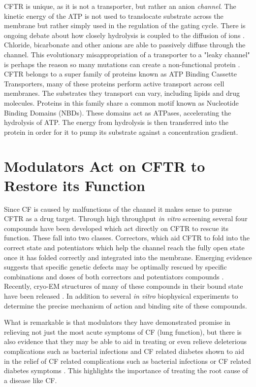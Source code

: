 CFTR is unique, as it is not a transporter, but rather an anion \textit{channel}. The kinetic energy of the ATP is not used to translocate substrate across the membrane but rather simply used in the regulation of the gating cycle. There is ongoing debate about how closely hydrolysis is coupled to the diffusion of ions \cite{}. Chloride, bicarbonate and other anions are able to passively diffuse through the channel. This evolutionary misappropriation of a transporter to a "leaky channel" is perhaps the reason so many mutations can create a non-functional protein \cite{depristo2005,linsdell2018}.
CFTR belongs to a super family of proteins known as ATP Binding Cassette Transporters,  many of these proteins perform active transport across cell membranes. The substrates they transport can vary, including lipids and drug molecules. Proteins in this family share a common motif known as Nucleotide Binding Domains (NBDs). These domains act as ATPases, accelerating the hydrolysis of ATP. The energy from hydrolysis is then transferred into the protein in order for it to pump its substrate against a concentration gradient. 


\section{Modulators Act on CFTR to Restore its Function}
Since CF is caused by malfunctions of the channel it makes sense to pursue CFTR as a drug target. Through high throughput \textit{in vitro} screening several four compounds have been developed which act directly on CFTR to rescue its function. These fall into two classes. Correctors, which aid CFTR to fold into the correct state and potentiators which help the channel reach the fully open state once it has folded correctly and integrated into the membrane. Emerging evidence suggests that specific genetic defects may be optimally rescued by specific combinations and doses of both correctors and potentiators compounds \cite{}. Recently, cryo-EM structures of many of these compounds in their bound state have been released \cite{liu2019, fiedorczuk2022}. In addition to several \textit {in vitro} biophysical experiments to determine the precise mechanism of action and binding site of these compounds.

What is remarkable is that modulators they have demonstrated promise in relieving not just the most acute symptoms of CF (lung function), but there is also evidence that they may be able to aid in treating or even relieve deleterious complications such as bacterial infections and CF related diabetes  shown to aid in the relief of CF related complications such as bacterial infections or CF related diabetes symptoms \cite{gaines2021,lopes-pacheco2020, yi2021}. This highlights the importance of treating the root cause of a disease like CF.

